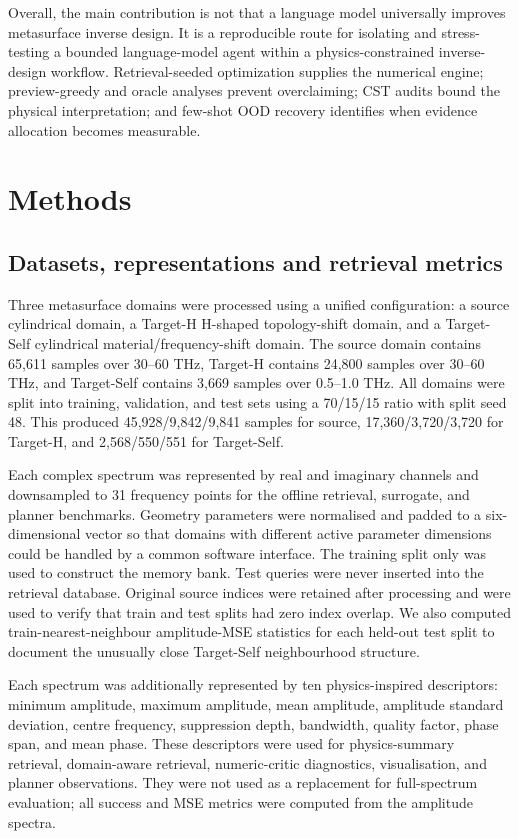 \documentclass[final,1p,times]{elsarticle}
\begin{document}
Overall, the main contribution is not that a language model universally improves metasurface inverse design. It is a reproducible route for isolating and stress-testing a bounded language-model agent within a physics-constrained inverse-design workflow. Retrieval-seeded optimization supplies the numerical engine; preview-greedy and oracle analyses prevent overclaiming; CST audits bound the physical interpretation; and few-shot OOD recovery identifies when evidence allocation becomes measurable.


\section{Methods}

\subsection{Datasets, representations and retrieval metrics}

Three metasurface domains were processed using a unified configuration: a source cylindrical domain, a Target-H H-shaped topology-shift domain, and a Target-Self cylindrical material/frequency-shift domain. The source domain contains 65,611 samples over 30--60 THz, Target-H contains 24,800 samples over 30--60 THz, and Target-Self contains 3,669 samples over 0.5--1.0 THz. All domains were split into training, validation, and test sets using a 70/15/15 ratio with split seed 48. This produced 45,928/9,842/9,841 samples for source, 17,360/3,720/3,720 for Target-H, and 2,568/550/551 for Target-Self.

Each complex spectrum was represented by real and imaginary channels and downsampled to 31 frequency points for the offline retrieval, surrogate, and planner benchmarks. Geometry parameters were normalised and padded to a six-dimensional vector so that domains with different active parameter dimensions could be handled by a common software interface. The training split only was used to construct the memory bank. Test queries were never inserted into the retrieval database. Original source indices were retained after processing and were used to verify that train and test splits had zero index overlap. We also computed train-nearest-neighbour amplitude-MSE statistics for each held-out test split to document the unusually close Target-Self neighbourhood structure.

Each spectrum was additionally represented by ten physics-inspired descriptors: minimum amplitude, maximum amplitude, mean amplitude, amplitude standard deviation, centre frequency, suppression depth, bandwidth, quality factor, phase span, and mean phase. These descriptors were used for physics-summary retrieval, domain-aware retrieval, numeric-critic diagnostics, visualisation, and planner observations. They were not used as a replacement for full-spectrum evaluation; all success and MSE metrics were computed from the amplitude spectra.
\end{document}
